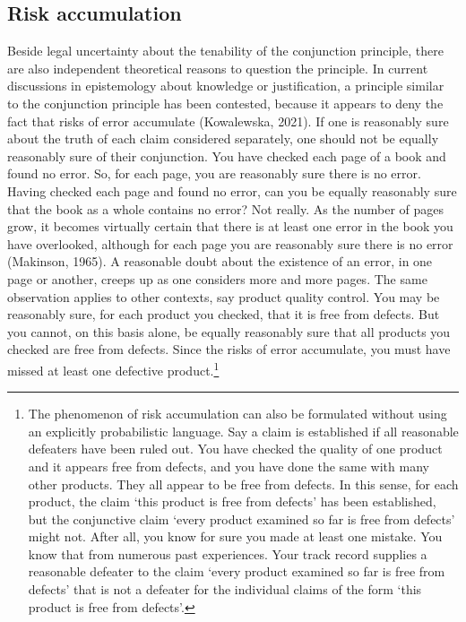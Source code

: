 \documentclass[
  10pt,
  dvipsnames,enabledeprecatedfontcommands]{scrartcl}
\begin{document}
\hypertarget{risk-accumulation}{%
\subsection{Risk accumulation}\label{risk-accumulation}}

Beside legal uncertainty about the tenability of the conjunction
principle, there are also independent theoretical reasons to question
the principle. In current discussions in epistemology about knowledge or
justification, a principle similar to the conjunction principle has been
contested, because it appears to deny the fact that risks of error
accumulate (Kowalewska, 2021). If one is reasonably sure about the truth
of each claim considered separately, one should not be equally
reasonably sure of their conjunction. You have checked each page of a
book and found no error. So, for each page, you are reasonably sure
there is no error. Having checked each page and found no error, can you
be equally reasonably sure that the book as a whole contains no error?
Not really. As the number of pages grow, it becomes virtually certain
that there is at least one error in the book you have overlooked,
although for each page you are reasonably sure there is no error
(Makinson, 1965). A reasonable doubt about the existence of an error, in
one page or another, creeps up as one considers more and more pages. The
same observation applies to other contexts, say product quality control.
You may be reasonably sure, for each product you checked, that it is
free from defects. But you cannot, on this basis alone, be equally
reasonably sure that all products you checked are free from defects.
Since the risks of error accumulate, you must have missed at least one
defective product.\footnote{The phenomenon of risk accumulation can also
  be formulated without using an explicitly probabilistic language. Say
  a claim is established if all reasonable defeaters have been ruled
  out. You have checked the quality of one product and it appears free
  from defects, and you have done the same with many other products.
  They all appear to be free from defects. In this sense, for each
  product, the claim `this product is free from defects' has been
  established, but the conjunctive claim `every product examined so far
  is free from defects' might not. After all, you know for sure you made
  at least one mistake. You know that from numerous past experiences.
  Your track record supplies a reasonable defeater to the claim `every
  product examined so far is free from defects' that is not a defeater
  for the individual claims of the form `this product is free from
  defects'.}
\end{document}
